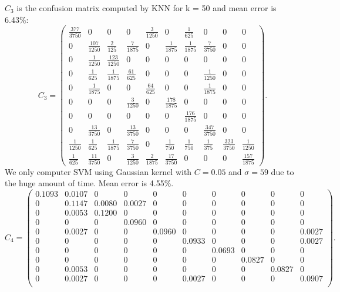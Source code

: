 \documentclass[11pt]{article}
\begin{document}
$C_3$ is the confusion matrix computed by KNN for k = 50 and mean error is 6.43\%:
$$C_3 = \left(\begin{array}{cccccccccc} \frac{377}{3750} & 0 & 0 & 0 & \frac{3}{1250} & 0 & \frac{1}{625} & 0 & 0 & 0\\ 0 & \frac{107}{1250} & \frac{2}{125} & \frac{7}{1875} & 0 & \frac{1}{1875} & \frac{1}{1875} & \frac{7}{3750} & 0 & 0\\ 0 & \frac{1}{1250} & \frac{123}{1250} & 0 & 0 & 0 & 0 & 0 & 0 & 0\\ 0 & \frac{1}{625} & \frac{1}{1875} & \frac{61}{625} & 0 & 0 & 0 & \frac{1}{1250} & 0 & 0\\ 0 & \frac{1}{1875} & 0 & 0 & \frac{64}{625} & 0 & 0 & \frac{1}{1875} & 0 & 0\\ 0 & 0 & 0 & \frac{3}{1250} & 0 & \frac{178}{1875} & 0 & 0 & 0 & 0\\ 0 & 0 & 0 & 0 & 0 & 0 & \frac{176}{1875} & 0 & 0 & 0\\ 0 & \frac{13}{3750} & 0 & \frac{13}{3750} & 0 & 0 & 0 & \frac{347}{3750} & 0 & 0\\ \frac{1}{1250} & \frac{1}{625} & \frac{1}{1875} & \frac{7}{3750} & 0 & \frac{1}{750} & \frac{1}{750} & \frac{1}{375} & \frac{323}{3750} & \frac{1}{1250}\\ \frac{1}{625} & \frac{11}{3750} & 0 & \frac{3}{1250} & \frac{2}{1875} & \frac{17}{3750} & 0 & 0 & 0 & \frac{157}{1875} \end{array}\right).$$
We only computer SVM using Gaussian kernel with $C=0.05$ and $\sigma = 59$ due to the huge amount of time. Mean error is 4.55\%.
$$
C_4 = \left(\begin{array}{cccccccccc}
0.1093&0.0107&0     &0     &0     &0     &0     &0     &0     &0      \\
0     &0.1147&0.0080&0.0027&0     &0     &0     &0     &0     &0      \\
0     &0.0053&0.1200&0     &0     &0     &0     &0     &0     &0      \\
0     &0     &0     &0.0960&0     &0     &0     &0     &0     &0      \\
0     &0.0027&0     &0     &0.0960&0     &0     &0     &0     &0.0027 \\
0     &0     &0     &0     &0     &0.0933&0     &0     &0     &0.0027 \\
0     &0     &0     &0     &0     &0     &0.0693&0     &0     &0      \\
0     &0     &0     &0     &0     &0     &0     &0.0827&0     &0      \\
0     &0.0053&0     &0     &0     &0     &0     &0     &0.0827&0      \\
0     &0.0027&0     &0     &0     &0.0027&0     &0     &0     &0.0907 \\
\end{array}\right).$$
\end{document}
